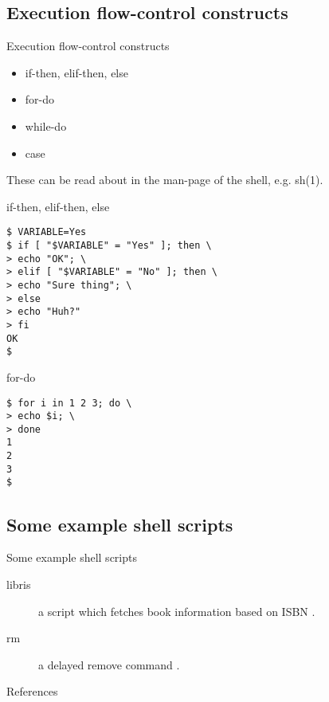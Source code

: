 \documentclass[handout]{beamer}
\begin{document}
\subsection{Execution flow-control constructs}
\begin{frame}{Execution flow-control constructs}
	\begin{itemize}
		\item if-then, elif-then, else
		\item for-do
		\item while-do
		\item case
	\end{itemize}
	These can be read about in the man-page of the shell, e.g. sh(1).
\end{frame}
\begin{frame}[fragile]{if-then, elif-then, else}
	\begin{lstlisting}
$ VARIABLE=Yes
$ if [ "$VARIABLE" = "Yes" ]; then \
> echo "OK"; \
> elif [ "$VARIABLE" = "No" ]; then \
> echo "Sure thing"; \
> else
> echo "Huh?"
> fi
OK
$
	\end{lstlisting}
\end{frame}
\begin{frame}[fragile]{for-do}
	\begin{lstlisting}
$ for i in 1 2 3; do \
> echo $i; \
> done
1
2
3
$
	\end{lstlisting}
\end{frame}
\begin{comment}
\begin{frame}[fragile]{while-do}
	\begin{lstlisting}
$
	\end{lstlisting}
\end{frame}
\begin{frame}[fragile]{case}
	\begin{lstlisting}
$
	\end{lstlisting}
\end{frame}
\end{comment}

\subsection{Some example shell scripts}
\begin{frame}{Some example shell scripts}
	\begin{description}
		\item[libris] a script which fetches book information based on ISBN 
			\citep[for source see][]{Bosk2010libris}.
		\item[rm] a delayed remove command \citep[for source see][]{Bosk2012rm}.
	\end{description}
\end{frame}



\begin{frame}{References}
	
\end{frame}
\end{document}
